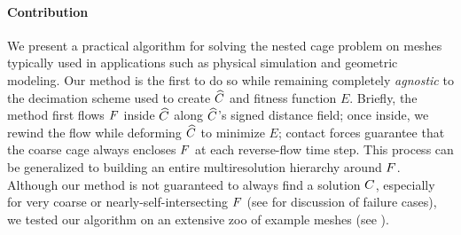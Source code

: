\paragraph{Contribution} We present a practical algorithm for solving the
nested cage problem on meshes typically used in applications such as physical
simulation and geometric modeling. Our method is the first to do so while
remaining completely \emph{agnostic} to the decimation scheme used to create
$\widehat{C}$ and fitness function $E$. Briefly, the method first flows $F$ inside $\widehat{C}$
along $\widehat{C}$'s signed distance field; once inside, we rewind the flow while
deforming $\widehat{C}$ to minimize $E$; contact forces guarantee that the coarse cage
always encloses $F$ at each reverse-flow time step. This process can be
generalized to building an entire multiresolution hierarchy around $F$.
Although our method is not guaranteed to always find a solution $C$,
especially for very coarse or nearly-self-intersecting $F$ (see
for discussion of failure cases), we tested our algorithm on an extensive zoo
of example meshes (see ).

